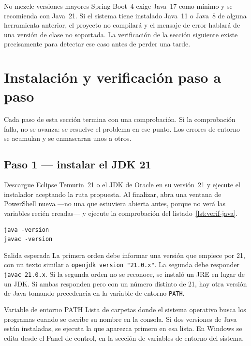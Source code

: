 \documentclass[11pt,a4paper,openany]{book}
\begin{document}
\begin{cajaadvertencia}{No mezcle versiones mayores}
	Spring Boot~4 exige Java~17 como mínimo y se recomienda con Java~21. Si el sistema tiene instalado Java~11 o Java~8 de alguna herramienta anterior, el proyecto no compilará y el mensaje de error hablará de una versión de clase no soportada. La verificación de la sección siguiente existe precisamente para detectar ese caso antes de perder una tarde.
\end{cajaadvertencia}

\section{Instalación y verificación paso a paso}
\label{sec:instalacion}

Cada paso de esta sección termina con una comprobación. Si la comprobación falla, no se avanza: se resuelve el problema en ese punto. Los errores de entorno se acumulan y se enmascaran unos a otros.

\subsection{Paso 1 --- instalar el JDK 21}
\label{sec:paso-jdk}

Descargue Eclipse Temurin~21 o el JDK de Oracle en su versión~21 y ejecute el instalador aceptando la ruta propuesta. Al finalizar, abra una ventana de PowerShell nueva ---no una que estuviera abierta antes, porque no verá las variables recién creadas--- y ejecute la comprobación del listado~\ref{lst:verif-java}.

\begin{lstlisting}[style=shell,caption={Verificacion de la instalacion del JDK.},label={lst:verif-java}]
java -version
javac -version
\end{lstlisting}

\begin{cajaejemplo}{Salida esperada}
	La primera orden debe informar una versión que empiece por 21, con un texto similar a \texttt{openjdk version "21.0.x"}. La segunda debe responder \texttt{javac 21.0.x}. Si la segunda orden no se reconoce, se instaló un JRE en lugar de un JDK. Si ambas responden pero con un número distinto de 21, hay otra versión de Java tomando precedencia en la variable de entorno \texttt{PATH}.
\end{cajaejemplo}

\begin{cajadefinicion}{Variable de entorno PATH}
	Lista de carpetas donde el sistema operativo busca los programas cuando se escribe su nombre en la consola. Si dos versiones de Java están instaladas, se ejecuta la que aparezca primero en esa lista. En Windows se edita desde el Panel de control, en la sección de variables de entorno del sistema.
\end{cajadefinicion}
\end{document}
